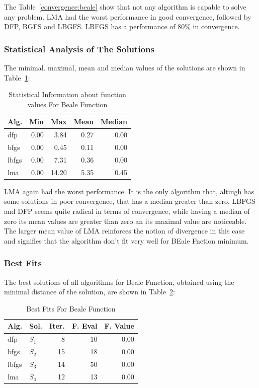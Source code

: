 \documentclass[conference]{IEEEtran}
\begin{document}
The Table~\ref{convergence:beale} show that not any algorithm
is capable to solve any problem. LMA had the worst performance
in good convergence, followed by DFP, BGFS and LBGFS. LBFGS has
a performance of 80\% in convergence.


\subsubsection{Statistical Analysis of The Solutions}
\label{statisticalanalysisbeale2D}

The minimal. maximal, mean and median values of the solutions are shown in Table~\ref{function_values:beale}:

\begin{table}[H]
\centering
\caption{Statistical Information about function values For Beale Function}
\label{function_values:beale}
\begin{tabular}{lrrrr}
\toprule
 Alg. &  Min &   Max &  Mean &  Median \\
\midrule
  dfp & 0.00 &  3.84 &  0.27 &    0.00 \\
 bfgs & 0.00 &  0.45 &  0.11 &    0.00 \\
lbfgs & 0.00 &  7.31 &  0.36 &    0.00 \\
  lma & 0.00 & 14.20 &  5.35 &    0.45 \\
\bottomrule
\end{tabular}
\end{table}

LMA again had the worst performance. It is the only algorithm that, altiugh has some solutions in
poor convergence, that has a median greater than zero. LBFGS and DFP seems quite radical in terms
of convergence, while having a median of zero its mean values are greater than zero an its maximal
value are noticeable. The larger mean value of LMA reinforces the notion of divergence in this case
and signifies that the algorithm don't fit very well for BEale Fnction minimum.


\subsubsection{Best Fits}
\label{bestfitsbeale2D}

The best solutions of all algorithms for Beale Function, obtained using the minimal
distance of the solution, are shown in Table~\ref{solutions:beale}:

\begin{table}[H]
\centering
\caption{Best Fits For Beale Function}
\label{solutions:beale}
\begin{tabular}{llrrr}
\toprule
 Alg. &    Sol. &  Iter. &  F. Eval &  F. Value \\
\midrule
  dfp & $S_{1}$ &      8 &       10 &      0.00 \\
 bfgs & $S_{2}$ &     15 &       18 &      0.00 \\
lbfgs & $S_{3}$ &     14 &       50 &      0.00 \\
  lma & $S_{4}$ &     12 &       13 &      0.00 \\
\bottomrule
\end{tabular}
\end{table}
\end{document}

